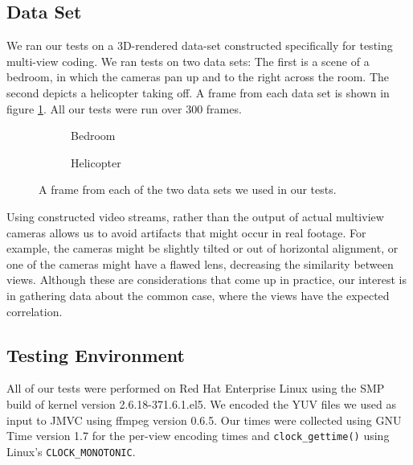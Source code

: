 \documentclass[twoside, 11pt]{article}
\begin{document}
\subsection{Data Set}
\label{subsec:data-set}
We ran our tests on a 3D-rendered data-set constructed specifically for testing
multi-view coding. We ran tests on two data sets: The first is a scene of a
bedroom, in which the cameras pan up and to the right across the room. The
second depicts a helicopter taking off. A frame from each data set is shown in
figure \ref{fig:data-set}. All our tests were run over 300 frames.

\begin{figure}[H]
\centering
\begin{subfigure}{.5\textwidth}
\centering
{}
\caption{Bedroom}
\end{subfigure}%
\begin{subfigure}{.5\textwidth}
\centering
{}
\caption{Helicopter}
\end{subfigure}
\caption{A frame from each of the two data sets we used in our tests.}
\label{fig:data-set}
\end{figure}

Using constructed video streams, rather than the output of actual multiview
cameras allows us to avoid artifacts that might occur in real footage. For
example, the cameras might be slightly tilted or out of horizontal alignment,
or one of the cameras might have a flawed lens, decreasing the similarity
between views. Although these are considerations that come up in practice,
our interest is in gathering data about the common case, where the views
have the expected correlation.

\subsection{Testing Environment}
\label{subsec:environment}
All of our tests were performed on Red Hat Enterprise Linux using the SMP build
of kernel version 2.6.18-371.6.1.el5. We encoded the YUV files we used as input
to JMVC using ffmpeg version 0.6.5. Our times were collected using GNU Time
version 1.7 for the per-view encoding times and {\tt clock\_gettime()} using
Linux's {\tt CLOCK\_MONOTONIC}.
\end{document}
